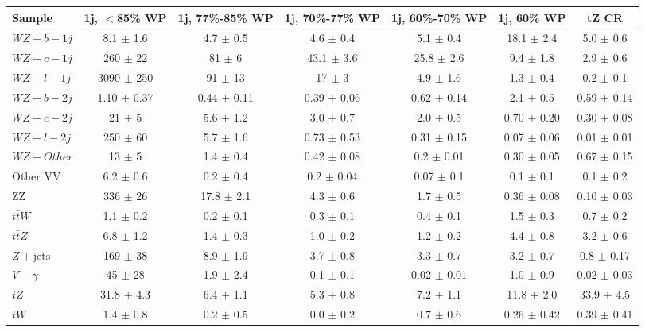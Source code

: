 \begin{tabular}{|l|c|c|c|c|c|c|}
\hline 
Sample & {1j, $<$85\% WP} & {1j, 77\%-85\% WP} & {1j, 70\%-77\% WP} & {1j, 60\%-70\% WP} & {1j, 60\% WP} & {tZ CR}\\
\hline 
  $WZ + b - 1j$   & 8.1 $\pm$ 1.6 & 4.7 $\pm$ 0.5 & 4.6 $\pm$ 0.4 & 5.1 $\pm$ 0.4 & 18.1 $\pm$ 2.4 & 5.0 $\pm$ 0.6 \\ 
  $WZ + c - 1j$   & 260 $\pm$ 22 & 81 $\pm$ 6 & 43.1 $\pm$ 3.6 & 25.8 $\pm$ 2.6 & 9.4 $\pm$ 1.8 & 2.9 $\pm$ 0.6 \\ 
  $WZ + l - 1j$   & 3090 $\pm$ 250 & 91 $\pm$ 13 & 17 $\pm$ 3 & 4.9 $\pm$ 1.6 & 1.3 $\pm$ 0.4 & 0.2 $\pm$ 0.1 \\ 
  $WZ + b - 2j$   & 1.10 $\pm$ 0.37 & 0.44 $\pm$ 0.11 & 0.39 $\pm$ 0.06 & 0.62 $\pm$ 0.14 & 2.1 $\pm$ 0.5 & 0.59 $\pm$ 0.14 \\
  $WZ + c - 2j$   & 21 $\pm$ 5 & 5.6 $\pm$ 1.2 & 3.0 $\pm$ 0.7 & 2.0 $\pm$ 0.5 & 0.70 $\pm$ 0.20 & 0.30 $\pm$ 0.08\\
  $WZ + l - 2j$   & 250 $\pm$ 60 & 5.7 $\pm$ 1.6 & 0.73 $\pm$ 0.53 & 0.31 $\pm$ 0.15 & 0.07 $\pm$ 0.06 & 0.01 $\pm$ 0.01 \\
  $WZ - Other$   & 13 $\pm$ 5 & 1.4 $\pm$ 0.4 & 0.42 $\pm$ 0.08 & 0.2 $\pm$ 0.01 & 0.30 $\pm$ 0.05 & 0.67 $\pm$ 0.15 \\
  Other VV   & 6.2 $\pm$ 0.6 & 0.2 $\pm$ 0.4 & 0.2 $\pm$ 0.04 & 0.07 $\pm$ 0.1 & 0.1 $\pm$ 0.1 & 0.1 $\pm$ 0.2 \\ 
  ZZ   & 336 $\pm$ 26 & 17.8 $\pm$ 2.1 & 4.3 $\pm$ 0.6 & 1.7 $\pm$ 0.5 & 0.36 $\pm$ 0.08 & 0.10 $\pm$ 0.03 \\ 
  $t\bar{t}W$   & 1.1 $\pm$ 0.2 & 0.2 $\pm$ 0.1 & 0.3 $\pm$ 0.1 & 0.4 $\pm$ 0.1 & 1.5 $\pm$ 0.3 & 0.7 $\pm$ 0.2 \\ 
  $t\bar{t}Z$   & 6.8 $\pm$ 1.2 & 1.4 $\pm$ 0.3 & 1.0 $\pm$ 0.2 & 1.2 $\pm$ 0.2 & 4.4 $\pm$ 0.8 & 3.2 $\pm$ 0.6 \\ 
  $Z+\text{jets}$   & 169 $\pm$ 38 & 8.9 $\pm$ 1.9 & 3.7 $\pm$ 0.8 & 3.3 $\pm$ 0.7 & 3.2 $\pm$ 0.7 & 0.8 $\pm$ 0.17 \\ 
  $V+\gamma$   & 45 $\pm$ 28 & 1.9 $\pm$ 2.4 & 0.1 $\pm$ 0.1 & 0.02 $\pm$ 0.01 & 1.0 $\pm$ 0.9 & 0.02 $\pm$ 0.03 \\ 
  $tZ$   & 31.8 $\pm$ 4.3 & 6.4 $\pm$ 1.1 & 5.3 $\pm$ 0.8 & 7.2 $\pm$ 1.1 & 11.8 $\pm$ 2.0 & 33.9 $\pm$ 4.5 \\ 
  $tW$   & 1.4 $\pm$ 0.8 & 0.2 $\pm$ 0.5 & 0.0 $\pm$ 0.2 & 0.7 $\pm$ 0.6 & 0.26 $\pm$ 0.42 & 0.39 $\pm$ 0.41 \\ 

\end{tabular}

